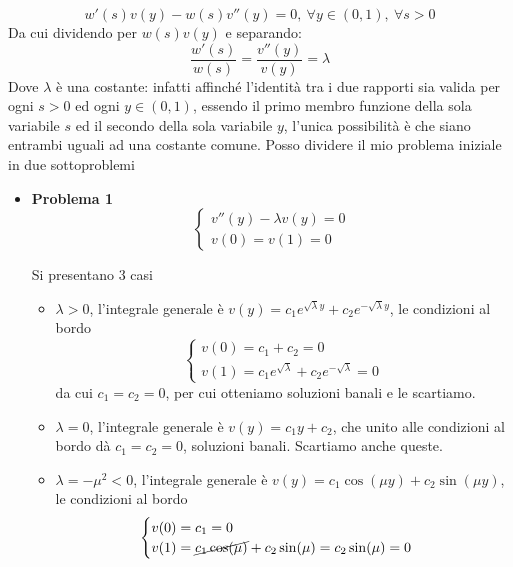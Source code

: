 \documentclass[10pt,a4paper,twoside,openright]{book}
\begin{document}
\begin{equation*}
w'(s) v(y) -w(s) v'' (y) =0,\ \forall y\in (0,1),\ \forall s >0
\end{equation*}
Da cui dividendo per $\displaystyle w(s) v(y)$ e separando:
\begin{equation*}
\frac{w'(s)}{w(s)} =\frac{v'' (y)}{v(y)} =\lambda 
\end{equation*}
Dove $\displaystyle \lambda $ è una costante: infatti affinché l'identità tra i due rapporti sia valida per ogni $\displaystyle s >0$ ed ogni $\displaystyle y\in (0,1)$, essendo il primo membro funzione della sola variabile $\displaystyle s$ ed il secondo della sola variabile $\displaystyle y$, l'unica possibilità è che siano entrambi uguali ad una costante comune. Posso dividere il mio problema iniziale in due sottoproblemi
\begin{itemize}
\item \textbf{Problema 1}\begin{equation*}
\begin{cases}
v'' (y) -\lambda v(y) =0\\
v(0) =v(1) =0
\end{cases}
\end{equation*}

Si presentano 3 casi
\begin{itemize}
\item $\displaystyle \lambda  >0$, l'integrale generale è $\displaystyle v(y) =c_{1} e^{\sqrt{\lambda } y} +c_{2} e^{-\sqrt{\lambda } y}$, le condizioni al bordo\begin{equation*}
\begin{cases}
v(0) =c_{1} +c_{2} =0\\
v(1) =c_{1} e^{\sqrt{\lambda }} +c_{2} e^{-\sqrt{\lambda }} =0
\end{cases}
\end{equation*}da cui $\displaystyle c_{1} =c_{2} =0$, per cui otteniamo soluzioni banali e le scartiamo.
\item $\displaystyle \lambda =0$, l'integrale generale è $\displaystyle v(y) =c_{1} y+c_{2}$, che unito alle condizioni al bordo dà $\displaystyle c_{1} =c_{2} =0$, soluzioni banali. Scartiamo anche queste.
\item $\displaystyle \lambda =-\mu ^{2} < 0$, l'integrale generale è $\displaystyle v(y) =c_{1}\cos(\mu y) +c_{2}\sin(\mu y)$, le condizioni al bordo\begin{equation*}
\begin{cases}
v(0) =c_{1} =0\\
v(1) =\cancel{c_{1}\cos(\mu)} +c_{2}\sin(\mu) =c_{2}\sin(\mu) =0
\end{cases}
\end{equation*}


\end{itemize}
\end{itemize}
\end{document}
